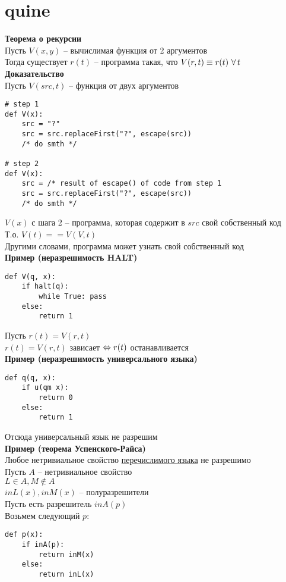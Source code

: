\documentclass[12pt]{article}
\begin{document}
\section{quine}
\textbf{Теорема о рекурсии}\\
Пусть $V(x, y)$ -- вычислимая функция от 2 аргументов\\
Тогда существует $r(t)$ -- программа такая, что $V(r, t) \equiv r(t)\ \fall t$\\
\textbf{Доказательство}\\
Пусть $V(src, t)$ -- функция от двух аргументов\\
\begin{lstlisting}
# step 1
def V(x):
    src = "?"
    src = src.replaceFirst("?", escape(src))
    /* do smth */

# step 2
def V(x):
    src = /* result of escape() of code from step 1
    src = src.replaceFirst("?", escape(src))
    /* do smth */
\end{lstlisting}
$V(x)$ с шага 2 -- программа, которая содержит в $src$ свой собственный код\\
Т.о. $V(t) == V(V, t)$\\
Другими словами, программа может узнать свой собственный код\\
\textbf{Пример (неразрешимость HALT)}
\begin{lstlisting}
def V(q, x):
    if halt(q):
        while True: pass
    else:
        return 1

\end{lstlisting}
Пусть $r(t) = V(r, t)$\\
$r(t) = V(r, t)$ зависает $\Leftrightarrow r(t)$ останавливается\\
\textbf{Пример (неразрешимость универсального языка)}
\begin{lstlisting}
def q(q, x):
    if u(qm x):
        return 0
    else:
        return 1
\end{lstlisting}
Отсюда универсальный язык не разрешим\\
\textbf{Пример (теорема Успенского-Райса)}\\
Любое нетривиальное свойство \underline{перечислимого языка} не разрешимо\\
Пусть $A$ -- нетривиальное свойство\\
$L \in A, M \not\in A$\\
$inL(x), inM(x)$ -- полуразрешители\\
Пусть есть разрешитель $inA(p)$\\
Возьмем следующий $p$:
\begin{lstlisting}
def p(x):
    if inA(p):
        return inM(x)
    else:
        return inL(x)
\end{lstlisting}
\end{document}
